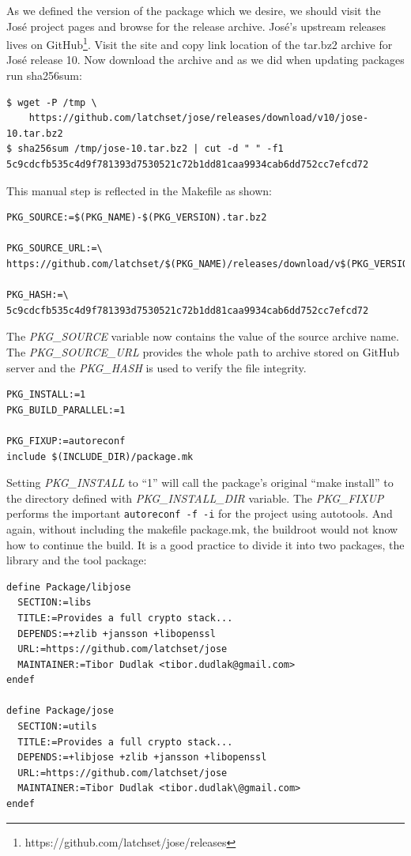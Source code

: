 As we defined the version of the package which we desire, we should visit the José project pages and browse for the release archive.
José's upstream releases lives on GitHub\footnote{https://github.com/latchset/jose/releases}.
Visit the site and copy link location of the tar.bz2 archive for José release 10.
Now download the archive and as we did when updating packages run sha256sum:
\begin{lstlisting}[columns=fixed,basicstyle=\ttfamily\footnotesize,tabsize=4,backgroundcolor=\color{yellow!10}]
$ wget -P /tmp \
    https://github.com/latchset/jose/releases/download/v10/jose-10.tar.bz2
$ sha256sum /tmp/jose-10.tar.bz2 | cut -d " " -f1
5c9cdcfb535c4d9f781393d7530521c72b1dd81caa9934cab6dd752cc7efcd72
\end{lstlisting}
This manual step is reflected in the Makefile as shown:
\begin{lstlisting}[columns=fixed,basicstyle=\ttfamily\footnotesize,tabsize=4,backgroundcolor=\color{yellow!10}]
PKG_SOURCE:=$(PKG_NAME)-$(PKG_VERSION).tar.bz2

PKG_SOURCE_URL:=\
https://github.com/latchset/$(PKG_NAME)/releases/download/v$(PKG_VERSION)/

PKG_HASH:=\
5c9cdcfb535c4d9f781393d7530521c72b1dd81caa9934cab6dd752cc7efcd72
\end{lstlisting}
The {\it PKG\_SOURCE} variable now contains the value of the source archive name.
The {\it PKG\_SOURCE\_URL} provides the whole path to archive stored on GitHub server and the {\it PKG\_HASH} is used to verify the file integrity.
\begin{lstlisting}[columns=fixed,basicstyle=\ttfamily\footnotesize,tabsize=4,backgroundcolor=\color{yellow!10}]
PKG_INSTALL:=1
PKG_BUILD_PARALLEL:=1

PKG_FIXUP:=autoreconf
include $(INCLUDE_DIR)/package.mk
\end{lstlisting}
Setting {\it PKG\_INSTALL} to “1” will call the package's original “make install” to the directory defined with {\it PKG\_INSTALL\_DIR} variable.
The {\it PKG\_FIXUP} performs the important {\tt autoreconf -f -i} for the project using autotools.
And again, without including the makefile package.mk, the buildroot would not know how to continue the build.
It is a good practice to divide it into two packages, the library and the tool package:
\begin{lstlisting}[columns=fixed,basicstyle=\ttfamily\footnotesize,tabsize=4,backgroundcolor=\color{yellow!10}]
define Package/libjose
  SECTION:=libs
  TITLE:=Provides a full crypto stack...
  DEPENDS:=+zlib +jansson +libopenssl
  URL:=https://github.com/latchset/jose
  MAINTAINER:=Tibor Dudlak <tibor.dudlak@gmail.com>
endef

define Package/jose
  SECTION:=utils
  TITLE:=Provides a full crypto stack...
  DEPENDS:=+libjose +zlib +jansson +libopenssl
  URL:=https://github.com/latchset/jose
  MAINTAINER:=Tibor Dudlak <tibor.dudlak\@gmail.com>
endef
\end{lstlisting}

